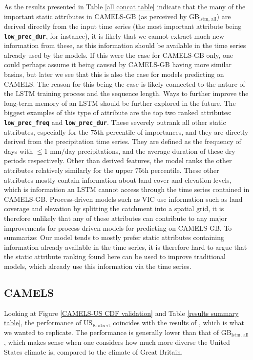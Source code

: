 As the results presented in Table \ref{all concat table}
indicate that the many of the important static attributes in CAMELS-GB (as perceived by 
GB$_\text{lstm, all}$) are derived directly from the 
input time series (the most important attribute being \textbf{\texttt{low\_prec\_dur}}, for instance), 
it is likely that we cannot extract much new information from 
these, as this information should be available in the time series already used by 
the models.
If this were the case for CAMELS-GB only, one could perhaps assume it being caused 
by CAMELS-GB having more similar basins, but later we see that this is also the 
case for models predicting on CAMELS.
The reason for this being the case is likely connected to the 
nature of the LSTM training process and the sequence length. Ways 
to further improve the long-term memory of an LSTM should be further explored 
in the future. The biggest examples of this type of attribute are the top two ranked 
attributes: \textbf{\texttt{low\_prec\_freq}} and \textbf{\texttt{low\_prec\_dur}}. 
These severely outrank all other static attributes, especially for the 75th percentile 
of importances, and they are directly derived from the precipitation time series.
They are defined as the frequency of days with $\leq 1$ mm$/$day precipitations, and 
the average duration of these dry periods respectively.
Other than derived features, the model ranks the other attributes relatively similarly 
for the upper 75th percentile. These other attributes mostly contain information 
about land cover and elevation levels, which is information an LSTM cannot access 
through the time series contained in CAMELS-GB. Process-driven models such as VIC 
use information such as land coverage and elevation by splitting the catchment 
into a spatial grid, it is therefore unlikely that any of these attributes can 
contribute to any major improvements for process-driven models for predicting 
on CAMELS-GB. To summarize: Our model tends to mostly prefer static attributes 
containing information already available in the time series, it is therefore hard 
to argue that the static attribute ranking found here can be used to improve 
traditional models, which already use this information via the time series.

\subsection{CAMELS}
Looking at Figure \ref{CAMELS-US CDF validation} and Table \ref{results summary table}, 
the performance of US$_\text{Kratzert}$ coincides with the results of \citet{lstm_third_paper}, 
which is what we wanted to replicate. The performance is generally lower than that 
of GB$_\text{lstm, all}$, which makes sense when one considers how much more diverse 
the United States climate is, compared to the climate of Great Britain. 

